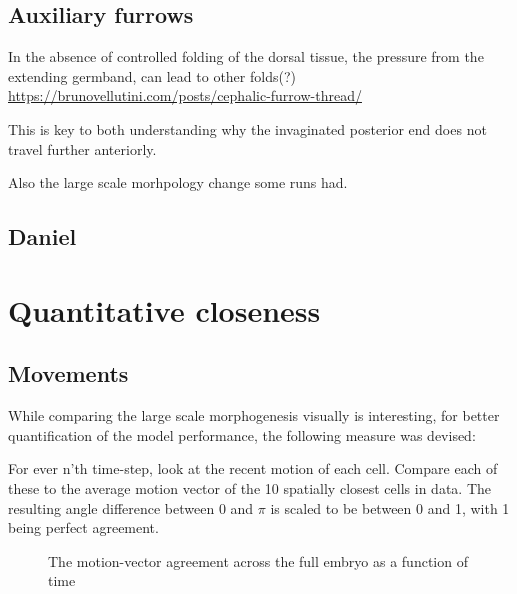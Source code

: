 \subsection{Auxiliary furrows}

In the absence of controlled folding of the dorsal tissue, the pressure from the extending germband, can lead to other folds(?) \url{https://brunovellutini.com/posts/cephalic-furrow-thread/}

This is key to both understanding why the invaginated posterior end does not travel further anteriorly.

Also the large scale morhpology change some runs had.
\subsection{Daniel}
\section{Quantitative closeness}
\subsection{Movements}
While comparing the large scale morphogenesis visually is interesting, for better quantification of the model performance, the following measure was devised:

For ever n'th time-step, look at the recent motion of each cell. Compare each of these to the average motion vector of the 10 spatially closest cells in data. The resulting angle difference between 0 and $\pi$ is scaled to be between 0 and 1, with 1 being perfect agreement.

\begin{figure}[H]
    \centering
    \caption{The motion-vector agreement across the full embryo as a function of time}
    \label{fig:enter-label}
\end{figure}

